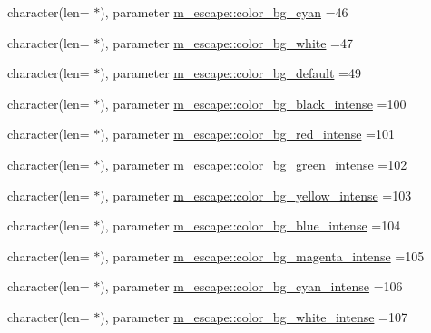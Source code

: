 \begin{DoxyCompactItemize}
\item 
character(len= $\ast$), parameter \mbox{\hyperlink{namespacem__escape_a895ed90037352c2ce2be6353f6764cb8}{m\+\_\+escape\+::color\+\_\+bg\+\_\+cyan}} =\textquotesingle{}46\textquotesingle{}
\item 
character(len= $\ast$), parameter \mbox{\hyperlink{namespacem__escape_a26cfeb6eefc9cd1a2c9f419db077ecb1}{m\+\_\+escape\+::color\+\_\+bg\+\_\+white}} =\textquotesingle{}47\textquotesingle{}
\item 
character(len= $\ast$), parameter \mbox{\hyperlink{namespacem__escape_af84f93410fbe9fa8fea3b02ac9371833}{m\+\_\+escape\+::color\+\_\+bg\+\_\+default}} =\textquotesingle{}49\textquotesingle{}
\item 
character(len= $\ast$), parameter \mbox{\hyperlink{namespacem__escape_a80a991f9ee93243b6b9bea07f2ec6d03}{m\+\_\+escape\+::color\+\_\+bg\+\_\+black\+\_\+intense}} =\textquotesingle{}100\textquotesingle{}
\item 
character(len= $\ast$), parameter \mbox{\hyperlink{namespacem__escape_aff3cc89066b789384257efec08bf5123}{m\+\_\+escape\+::color\+\_\+bg\+\_\+red\+\_\+intense}} =\textquotesingle{}101\textquotesingle{}
\item 
character(len= $\ast$), parameter \mbox{\hyperlink{namespacem__escape_a9ee5d5f2d0522ca3ea194de4d9a05dc3}{m\+\_\+escape\+::color\+\_\+bg\+\_\+green\+\_\+intense}} =\textquotesingle{}102\textquotesingle{}
\item 
character(len= $\ast$), parameter \mbox{\hyperlink{namespacem__escape_a79f01235a5d3b2ea250274a7ca1c2c43}{m\+\_\+escape\+::color\+\_\+bg\+\_\+yellow\+\_\+intense}} =\textquotesingle{}103\textquotesingle{}
\item 
character(len= $\ast$), parameter \mbox{\hyperlink{namespacem__escape_aac30abbb8eb6e1570e28dac2326113a7}{m\+\_\+escape\+::color\+\_\+bg\+\_\+blue\+\_\+intense}} =\textquotesingle{}104\textquotesingle{}
\item 
character(len= $\ast$), parameter \mbox{\hyperlink{namespacem__escape_af148e03515e36ed552e330ba495bcbba}{m\+\_\+escape\+::color\+\_\+bg\+\_\+magenta\+\_\+intense}} =\textquotesingle{}105\textquotesingle{}
\item 
character(len= $\ast$), parameter \mbox{\hyperlink{namespacem__escape_a6be9fe26e904b8714e035412ae4e6ad4}{m\+\_\+escape\+::color\+\_\+bg\+\_\+cyan\+\_\+intense}} =\textquotesingle{}106\textquotesingle{}
\item 
character(len= $\ast$), parameter \mbox{\hyperlink{namespacem__escape_af57687b3c8741aaab4c67bc1c697aeda}{m\+\_\+escape\+::color\+\_\+bg\+\_\+white\+\_\+intense}} =\textquotesingle{}107\textquotesingle{}

\end{DoxyCompactItemize}
